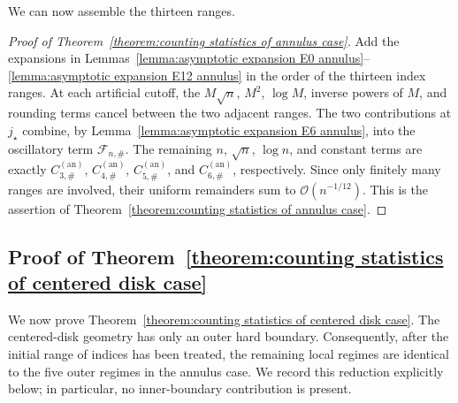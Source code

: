 \documentclass[a4paper]{article}
\numberwithin{equation}{section}
\begin{document}
We can now assemble the thirteen ranges.


\begin{proof}[Proof of Theorem~\ref{theorem:counting statistics of annulus case}]
Add the expansions in
Lemmas~\ref{lemma:asymptotic expansion E0 annulus}--\ref{lemma:asymptotic expansion E12 annulus}
in the order of the thirteen index ranges.  At each artificial cutoff, the
$M\sqrt n$, $M^2$, $\log M$, inverse powers of $M$, and rounding terms cancel
between the two adjacent ranges.  The two contributions at $j_\star$ combine,
by Lemma~\ref{lemma:asymptotic expansion E6 annulus}, into the oscillatory term
$\mathcal F_{n,\#}$.  The remaining $n$, $\sqrt n$, $\log n$, and constant
terms are exactly $C_{3,\#}^{(\mathrm{an})}$,
$C_{4,\#}^{(\mathrm{an})}$, $C_{5,\#}^{(\mathrm{an})}$, and
$C_{6,\#}^{(\mathrm{an})}$, respectively.  Since only finitely many ranges are
involved, their uniform remainders sum to $\mathcal O(n^{-1/12})$.  This is the
assertion of Theorem~\ref{theorem:counting statistics of annulus case}.
\end{proof}







\subsection{Proof of Theorem~\ref{theorem:counting statistics of centered disk case}}
We now prove Theorem~\ref{theorem:counting statistics of centered disk case}.  The
centered-disk geometry has only an outer hard boundary.  Consequently, after the
initial range of indices has been treated, the remaining local regimes are
identical to the five outer regimes in the annulus case.  We record this
reduction explicitly below; in particular, no inner-boundary contribution is
present.
\end{document}
